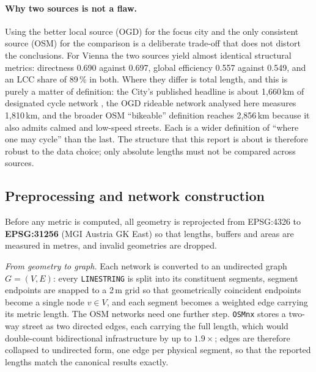 \documentclass[11pt,a4paper]{article}
\begin{document}
\paragraph{Why two sources is not a flaw.} Using the better local source (OGD) for the
focus city and the only consistent source (OSM) for the comparison is a deliberate
trade-off that does not distort the conclusions. For Vienna the two sources yield almost
identical structural metrics: directness 0.690 against 0.697, global efficiency 0.557
against 0.549, and an LCC share of 89\,\% in both. Where they differ is total length, and
this is purely a matter of definition: the City's published headline is about 1{,}660\,km
of designated cycle network \citep{wiencyclenet}, the OGD rideable network analysed here
measures 1{,}810\,km, and the broader OSM ``bikeable'' definition reaches 2{,}856\,km
because it also admits calmed and low-speed streets. Each is a wider definition of ``where
one may cycle'' than the last. The structure that this report is about is therefore robust
to the data choice; only absolute lengths must not be compared across sources.

\subsection{Preprocessing and network construction}

Before any metric is computed, all geometry is reprojected from EPSG:4326 to
\textbf{EPSG:31256} (MGI Austria GK East) so that lengths, buffers and areas are measured
in metres, and invalid geometries are dropped.

\emph{From geometry to graph.} Each network is converted to an undirected graph
\(G=(V,E)\): every \texttt{LINESTRING} is split into its constituent segments, segment
endpoints are snapped to a 2\,m grid so that geometrically coincident endpoints become a
single node \(v\in V\), and each segment becomes a weighted edge carrying its metric
length. The OSM networks need one further step. \texttt{OSMnx} stores a two-way street as
two directed edges, each carrying the full length, which would double-count bidirectional
infrastructure by up to \(1.9\times\); edges are therefore collapsed to undirected form,
one edge per physical segment, so that the reported lengths match the canonical results
exactly.
\end{document}
